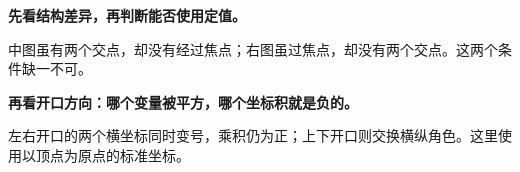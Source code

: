 \clearpage
\begin{trapbox}
\textbf{先看结构差异，再判断能否使用定值。}\begin{center}\end{center}
中图虽有两个交点，却没有经过焦点；右图虽过焦点，却没有两个交点。这两个条件缺一不可。
\end{trapbox}
\clearpage
\begin{trapbox}
\textbf{再看开口方向：哪个变量被平方，哪个坐标积就是负的。}\begin{center}\end{center}
左右开口的两个横坐标同时变号，乘积仍为正；上下开口则交换横纵角色。这里使用以顶点为原点的标准坐标。
\end{trapbox}

